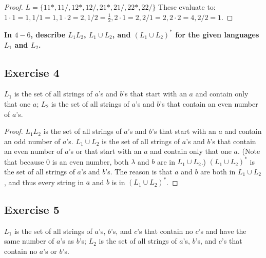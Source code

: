 \documentclass[14pt]{extarticle}
\newcommand{\cy}{\color{cyan}}
\begin{document}
\begin{proof}
\(L = \{11*, 11/, 12*, 12/, 21*, 21/, 22*, 22/\}\) These evaluate to: \\
\(1 \cdot 1 = 1, 1 / 1 = 1, 1 \cdot 2 = 2, 1 / 2 = \frac{1}{2}, 2 \cdot 1 = 2, 2 / 1 = 2, 2 \cdot 2 = 4, 2 / 2 = 1\).
\end{proof}

{\bf \cy In \(4-6\), describe \(L_1L_2\), \(L_1 \cup L_2\), and \((L_1 \cup L_2)^*\) for the given languages \(L_1\) and 
\(L_2\).}

\subsection{Exercise 4}
\(L_1\) is the set of all strings of \(a\)’s and \(b\)’s that start with an \(a\) and contain only that one \(a\); \(L_2\) 
is the set of all strings of \(a\)’s and \(b\)’s that contain an even number of \(a\)’s.

\begin{proof}
\(L_1L_2\) is the set of all strings of \(a\)’s and \(b\)’s that start with an \(a\) and contain an odd number of \(a\)’s. 
\(L_1 \cup L_2\) is the set of all strings of \(a\)’s and \(b\)’s that contain an even number of \(a\)’s or that start 
with an \(a\) and contain only that one \(a\). (Note that because 0 is an even number, both \(\lambda\) and \(b\) are in 
\(L_1 \cup L_2\).) \((L_1 \cup L_2)^*\) is the set of all strings of \(a\)’s and \(b\)’s. The reason is that \(a\) and 
\(b\) are both in \(L_1 \cup L_2\), and thus every string in \(a\) and \(b\) is in \((L_1 \cup L_2)^*\).
\end{proof}

\subsection{Exercise 5}
\(L_1\) is the set of all strings of \(a\)’s, \(b\)’s, and \(c\)’s that contain no \(c\)’s and have the same number of 
\(a\)’s as \(b\)’s; \(L_2\) is the set of all strings of \(a\)’s, \(b\)’s, and \(c\)’s that contain no \(a\)’s or 
\(b\)’s.
\end{document}
